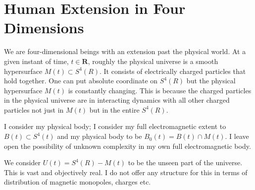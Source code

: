 \documentclass{amsart}
\begin{document}
\section{Human Extension in Four Dimensions}

We are four-dimensional beings with an extension past the physical world.  At a given instant of time, $t\in \mathbf{R}$, roughly the physical universe is a smooth hypersurface $M(t) \subset S^4(R)$.  It consists of electrically charged particles that hold together.  One can put absolute coordinate on $S^4(R)$ but the physical hypersurface $M(t)$ is constantly changing.  This is because the charged particles in the physical universe are in interacting dynamics with all other charged particles not just in $M(t)$ but in the entire $S^4(R)$.

I consider my physical body; I consider my full electromagnetic extent to $B(t) \subset S^4(t)$ and my physical body to be $B_0(t) = B(t) \cap M(t)$.  I leave open the possibility of unknown complexity in my own full electromagnetic body.  

We consider $U(t) = S^4(R) - M(t)$ to be the unseen part of the universe.  This is vast and objectively real.  I do not offer any structure for this in terms of distribution of magnetic monopoles, charges etc.
\end{document}
